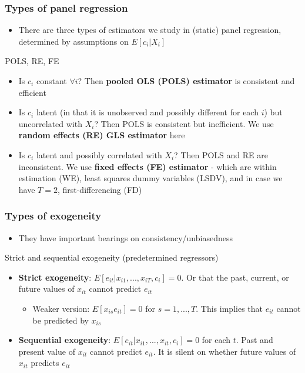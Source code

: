 \documentclass[aspectratio=169]{beamer}
\begin{document}
\begin{frame}
\frametitle{Types of panel regression}
\begin{itemize}
\item There are three types of estimators we study in (static) panel regression, determined by assumptions on $E[c_i|X_i]$
\end{itemize}
\begin{block}{POLS, RE, FE}
\begin{itemize}
\item Is $c_i$ constant $\forall i$? Then \textbf{pooled OLS (POLS) estimator} is consistent and efficient
\item Is $c_i$ latent (in that it is unobserved and possibly different for each $i$) but uncorrelated with $X_i$? Then POLS is consistent but inefficient. We use \textbf{random effects (RE) GLS estimator} here
\item Is $c_i$ latent and possibly correlated with $X_i$? Then POLS and RE are inconsistent. We use \textbf{fixed effects (FE) estimator} - which are within estimation (WE), least squares dummy variables (LSDV), and in case we have $T=2$, first-differencing (FD)
\end{itemize} 
\end{block}
\end{frame}

\begin{frame}
\frametitle{Types of exogeneity}
\begin{itemize}
\item They have important bearings on consistency/unbiasedness
\end{itemize}
\begin{block}{Strict and sequential exogeneity (predetermined regressors)}
\begin{itemize}
\item \textbf{Strict exogeneity}: $E[e_{it}|x_{i1},...,x_{iT},c_i]=0$. Or that the past, current, or future values of $x_{it}$ cannot predict $e_{it}$
\begin{itemize}
\item Weaker version: $E[x_{is}e_{it}]=0$ for $s=1,...,T$. This implies that $e_{it}$ cannot be predicted by $x_{is}$
\end{itemize}
\item  \textbf{Sequential exogeneity}: $E[e_{it}|x_{i1},...,x_{it},c_i]=0$ for each $t$. Past and present value of $x_{it}$ cannot predict $e_{it}$. It is silent on whether future values of $x_{it}$ predicts $e_{it}$
\end{itemize} 
\end{block}
\end{frame}
\end{document}
